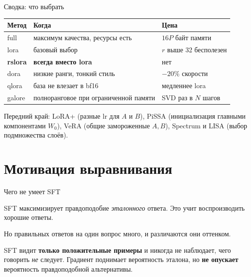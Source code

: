 \documentclass[11pt,aspectratio=169]{beamer}
\newcommand{\key}[1]{%
  \begin{center}\colorbox{boxbg}{\parbox{0.92\textwidth}{\vspace{2pt}#1\vspace{2pt}}}\end{center}}
\newcommand{\aside}[1]{{\color{dim}\small #1}}
\begin{document}
\begin{frame}{Сводка: что выбрать}

\begin{center}
\small
\begin{tabular}{@{}lp{4.2cm}p{4.6cm}@{}}
\toprule
\textbf{Метод} & \textbf{Когда} & \textbf{Цена} \\
\midrule
full & максимум качества, ресурсы есть & $16P$ байт памяти \\
lora & базовый выбор & $r$ выше 32 бесполезен \\
\textbf{rslora} & \textbf{всегда вместо lora} & нет \\
dora & низкие ранги, тонкий стиль & $-20\%$ скорости \\
qlora & база не влезает в bf16 & медленнее lora \\
galore & полноранговое при ограниченной памяти & SVD раз в $N$ шагов \\
\bottomrule
\end{tabular}
\end{center}

\vspace{1em}
\aside{Передний край: LoRA+ (разные lr для $A$ и $B$), PiSSA
(инициализация главными компонентами $W_0$), VeRA (общие замороженные
$A,B$), Spectrum и LISA (выбор подмножества слоёв).}

\end{frame}

\section{Мотивация выравнивания}

\begin{frame}{Чего не умеет SFT}

SFT максимизирует правдоподобие \emph{эталонного} ответа. Это учит
воспроизводить хорошие ответы.

\vspace{1em}
Но правильных ответов на один вопрос много, и различаются они оттенком.

\vspace{1em}
\key{SFT видит \textbf{только положительные примеры} и никогда не
наблюдает, чего говорить \emph{не} следует. Градиент поднимает
вероятность эталона, но \textbf{не опускает} вероятность правдоподобной
альтернативы.}

\end{frame}
\end{document}
